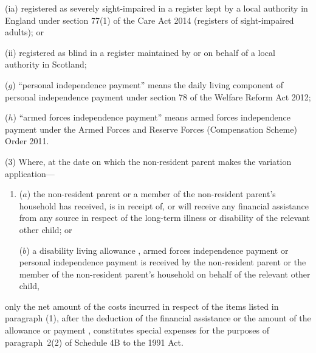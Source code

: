 \documentclass[12pt,a4paper]{article}
\begin{document}
\begin{enumerate}
\begin{enumerate}
(ia) registered as severely sight-impaired in a register kept by a local authority in England under section 77(1) of the Care Act 2014 (registers of sight-impaired adults); or

(ii) registered as blind in a register maintained by or on behalf of a local authority in Scotland;
\end{enumerate}

($g$) “personal independence payment” means the daily living component of personal independence payment under section 78 of the Welfare Reform Act 2012;

($h$) “armed forces independence payment” means armed forces independence payment under the Armed Forces and Reserve Forces (Compensation Scheme) Order 2011.
\end{enumerate}

(3) Where, at the date on which the non-resident parent makes the variation application—
\begin{enumerate}\item[]
($a$) the non-resident parent or a member of the non-resident parent’s household has received, is in receipt of, or will receive any financial assistance from any source in respect of the long-term illness or disability of the relevant other child; or

($b$) a disability living allowance%
, armed forces independence payment  %
or personal independence payment  %
is received by the non-resident parent or the member of the non-resident parent’s household on behalf of the relevant other child,
\end{enumerate}
only the net amount of the costs incurred in respect of the items listed in paragraph (1), after the deduction of the financial assistance or the amount of the allowance
or payment%
, constitutes special expenses for the purposes of paragraph~2(2) of Schedule 4B to the 1991 Act.
\end{document}
